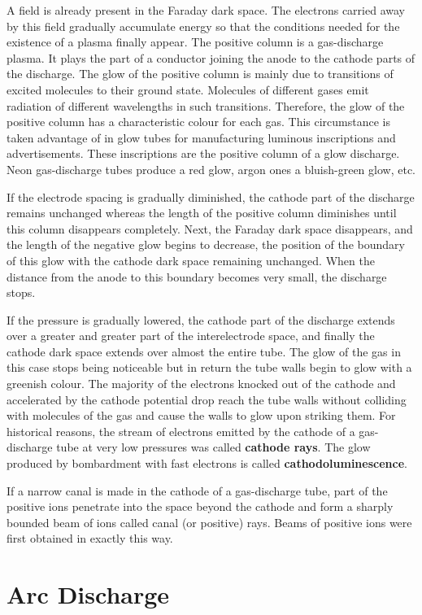 A field is already present in the Faraday dark space.
The electrons carried away by this field gradually accumulate energy so that the conditions needed for the existence of a plasma finally appear.
The positive column is a gas-discharge plasma.
It plays the part of a conductor joining the anode to the cathode parts of the discharge.
The glow of the positive column is mainly due to transitions of excited molecules to their ground state.
Molecules of different gases emit radiation of different wavelengths in such transitions.
Therefore, the glow of the positive column has a characteristic colour for each gas.
This circumstance is taken advantage of in glow tubes for manufacturing luminous inscriptions and advertisements.
These inscriptions are the positive column of a glow discharge.
Neon gas-discharge tubes produce a red glow, argon ones a bluish-green glow, etc.

If the electrode spacing is gradually diminished, the cathode part of the discharge remains unchanged whereas the length of the positive column diminishes until this column disappears completely.
Next, the Faraday dark space disappears, and the length of the negative glow begins to decrease, the position of the boundary of this glow with the cathode dark space remaining unchanged.
When the distance from the anode to this boundary becomes very small, the discharge stops.

If the pressure is gradually lowered, the cathode part of the discharge extends over a greater and greater part of the interelectrode space, and finally the cathode dark space extends over almost the entire tube.
The glow of the gas in this case stops being noticeable but in return the tube walls begin to glow with a greenish colour.
The majority of the electrons knocked out of the cathode and accelerated by the cathode potential drop reach the tube walls without colliding with molecules of the gas and cause the walls to glow upon
striking them.
For historical reasons, the stream of electrons emitted by the cathode of a gas-discharge tube at very low pressures was called \textbf{cathode rays}.
The glow produced by bombardment with fast electrons
is called \textbf{cathodoluminescence}.

If a narrow canal is made in the cathode of a gas-discharge tube, part of the positive ions penetrate into the space beyond the cathode and form a sharply bounded beam of ions called canal (or positive) rays.
Beams of positive ions were first obtained in exactly this way.

\section{Arc Discharge}\label{sec:12_7}


